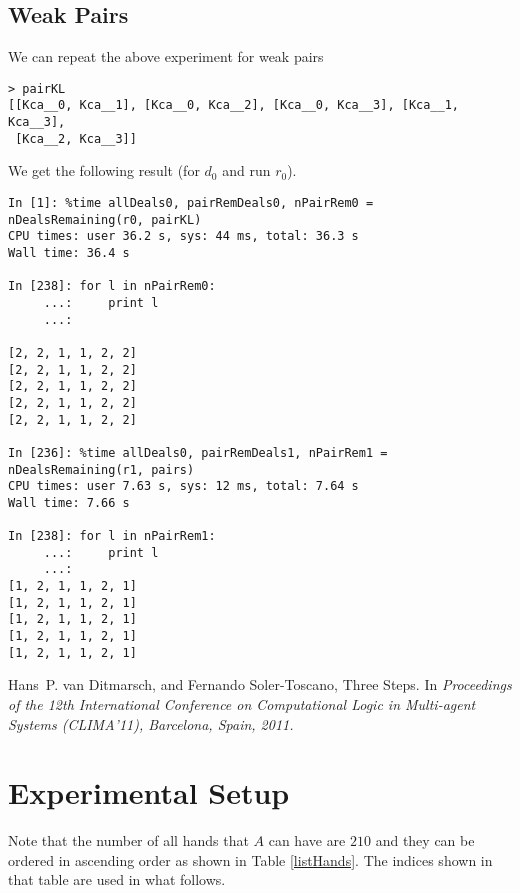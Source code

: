 \documentclass{article}
\begin{document}
\subsection{Weak Pairs}

We can repeat the above experiment for weak pairs 
\begin{verbatim}
> pairKL
[[Kca__0, Kca__1], [Kca__0, Kca__2], [Kca__0, Kca__3], [Kca__1, Kca__3], 
 [Kca__2, Kca__3]]
\end{verbatim}

We get the following result (for $d_0$ and run $r_0$).
\begin{verbatim}
In [1]: %time allDeals0, pairRemDeals0, nPairRem0 = nDealsRemaining(r0, pairKL)
CPU times: user 36.2 s, sys: 44 ms, total: 36.3 s
Wall time: 36.4 s

In [238]: for l in nPairRem0:
     ...:     print l
     ...:     

[2, 2, 1, 1, 2, 2]
[2, 2, 1, 1, 2, 2]
[2, 2, 1, 1, 2, 2]
[2, 2, 1, 1, 2, 2]
[2, 2, 1, 1, 2, 2]

In [236]: %time allDeals0, pairRemDeals1, nPairRem1 = nDealsRemaining(r1, pairs)
CPU times: user 7.63 s, sys: 12 ms, total: 7.64 s
Wall time: 7.66 s

In [238]: for l in nPairRem1:
     ...:     print l
     ...:     
[1, 2, 1, 1, 2, 1]
[1, 2, 1, 1, 2, 1]
[1, 2, 1, 1, 2, 1]
[1, 2, 1, 1, 2, 1]
[1, 2, 1, 1, 2, 1]

\end{verbatim}



\begin{thebibliography}{10}

Hans~P. van Ditmarsch, and Fernando Soler-Toscano,
\newblock Three Steps.
\newblock In {\em Proceedings of the 12th International Conference on Computational Logic in Multi-agent Systems
{(CLIMA'11)}, Barcelona, Spain, 2011.}

\end{thebibliography}

\newpage
\appendix
\section{Experimental Setup}

Note that the number of all hands that $A$ can have 
are $210$ and they can be ordered in ascending order
as shown in Table \ref{listHands}. The indices shown
in  that table are used in what follows. 
\end{document}
